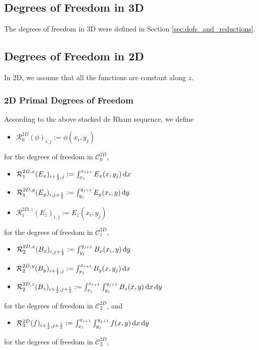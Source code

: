 \documentclass[11pt]{article}
\begin{document}
\subsection{Degrees of Freedom in 3D}

The degrees of freedom in 3D were defined in Section \ref{sec:dofs_and_reductions}.

\subsection{Degrees of Freedom in 2D}
\label{sec:dofs_2D}

In 2D, we assume that all the functions are constant along $z$.


\subsubsection{2D Primal Degrees of Freedom}

According to the above stacked de Rham sequence, we define

\begin{itemize}
    \item $\mathcal{R}^{2D}_0(\phi)_{i,j} := \phi(x_i,y_j)$
\end{itemize}
for the degrees of freedom in $\mathcal{C}_0^{2D}$,
\begin{itemize}
    \item $\mathcal{R}^{2D,x}_1(E_x)_{{i+\frac12},j} := \int_{x_i}^{x_{i+1}} E_x(x,y_j)\, {\rm d} x $
    \item $\mathcal{R}^{2D,y}_1(E_y)_{i,{j+\frac12}} := \int_{y_j}^{y_{j+1}} E_y(x_i,y)\, {\rm d} y $
    \item $\mathcal{R}^{2D,z}_1(E_z)_{i,j} := E_z(x_i,y_j)$
\end{itemize}
for the degrees of freedom in $\mathcal{C}_1^{2D}$,
\begin{itemize}
    \item $\mathcal{R}^{2D,x}_2(B_x)_{i,{j+\frac12}} := \int_{y_j}^{y_{j+1}} B_x(x_i,y)\, {\rm d} y $
    \item $\mathcal{R}^{2D,y}_2(B_y)_{{i+\frac12},j} := \int_{x_i}^{x_{i+1}} B_y(x,y_j)\, {\rm d} x $
    \item $\mathcal{R}^{2D,z}_2(B_z)_{{i+\frac12},{j+\frac12}} := \int_{x_i}^{x_{i+1}}\int_{y_j}^{y_{j+1}} B_z(x,y)\, {\rm d} x\, {\rm d} y $
\end{itemize}
for the degrees of freedom in $\mathcal{C}_2^{2D}$,
and 
\begin{itemize}
    \item $\mathcal{R}^{2D}_3(f)_{{i+\frac12},{j+\frac12}} := \int_{x_i}^{x_{i+1}}\int_{y_j}^{y_{j+1}} f(x,y)\, {\rm d} x\, {\rm d} y $
\end{itemize}
for the degrees of freedom in $\mathcal{C}_3^{2D}$,
\end{document}
